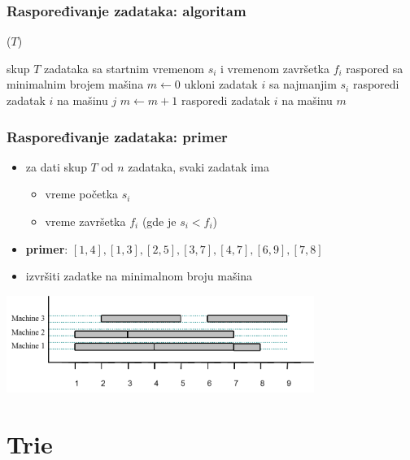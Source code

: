 \documentclass[compress]{beamer}
\begin{document}
\begin{frame}
  \frametitle{Raspoređivanje zadataka: algoritam}
  ($T$)
  \begin{algorithmic}
    \REQUIRE skup $T$ zadataka sa startnim vremenom $s_{i}$ i vremenom završetka $f_{i}$
    \ENSURE raspored sa minimalnim brojem mašina
    \STATE $m \leftarrow 0$ 
      \STATE ukloni zadatak $i$ sa najmanjim $s_{i}$
        \STATE rasporedi zadatak $i$ na mašinu $j$
      \ELSE
        \STATE $m \leftarrow m+1$
        \STATE rasporedi zadatak $i$ na mašinu $m$
      \ENDIF
    \ENDWHILE
  \end{algorithmic}    
\end{frame}

\begin{frame}[fragile]
  \frametitle{Raspoređivanje zadataka: primer}
  \begin{itemize}
    \item za dati skup $T$ od $n$ zadataka, svaki zadatak ima
    \begin{itemize}
      \item vreme početka $s_{i}$
      \item vreme završetka $f_{i}$ (gde je $s_{i}<f_{i}$)
    \end{itemize}
    \item \textbf{primer}: $[1,4],[1,3],[2,5],[3,7],[4,7],[6,9],[7,8]$
    \item izvršiti zadatke na minimalnom broju mašina
  \end{itemize}
  \begin{center}
    \includegraphics[width=10cm]{asp-13-pic17.png}
  \end{center}
\end{frame}

\section[Trie]{Trie}
\end{document}
